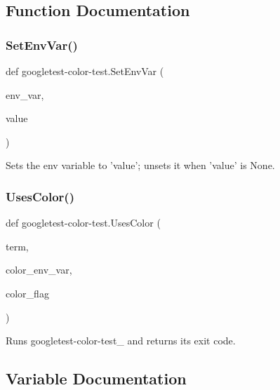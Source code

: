 \subsection{Function Documentation}
\mbox{\label{namespacegoogletest-color-test_a6892a0e83ce77517fa25534cc2c56210}} 
\subsubsection{\texorpdfstring{SetEnvVar()}{SetEnvVar()}}
{\footnotesize\ttfamily def googletest-\/color-\/test.\+Set\+Env\+Var (\begin{DoxyParamCaption}\item[{}]{env\+\_\+var,  }\item[{}]{value }\end{DoxyParamCaption})}

\begin{DoxyVerb}Sets the env variable to 'value'; unsets it when 'value' is None.\end{DoxyVerb}
 \mbox{\label{namespacegoogletest-color-test_a6b0f6528a3b277806378d1b0a7aa09bd}} 
\subsubsection{\texorpdfstring{UsesColor()}{UsesColor()}}
{\footnotesize\ttfamily def googletest-\/color-\/test.\+Uses\+Color (\begin{DoxyParamCaption}\item[{}]{term,  }\item[{}]{color\+\_\+env\+\_\+var,  }\item[{}]{color\+\_\+flag }\end{DoxyParamCaption})}

\begin{DoxyVerb}Runs googletest-color-test_ and returns its exit code.\end{DoxyVerb}
 

\subsection{Variable Documentation}
\mbox{\label{namespacegoogletest-color-test_a4ac2cb718d08e0e67fbdd90235860607}} 
